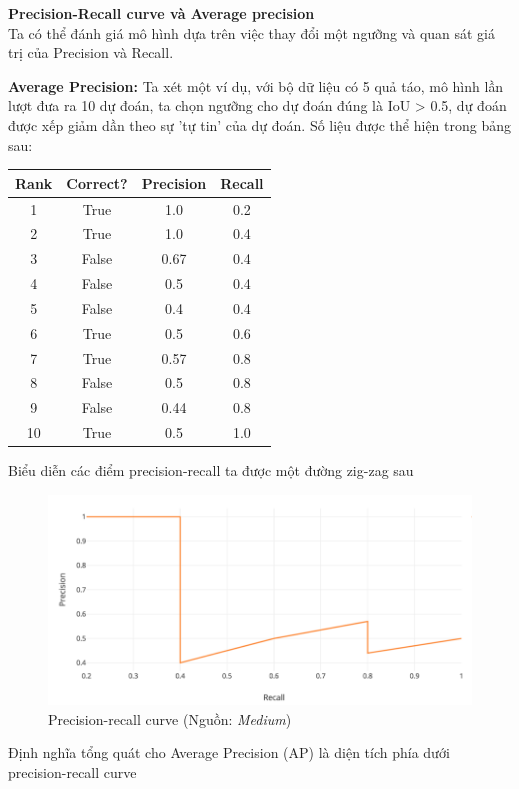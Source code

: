 \documentclass[a4paper, 12pt]{report}
\begin{document}
\textbf{Precision-Recall curve và Average precision}\\
Ta có thể đánh giá mô hình dựa trên việc thay đổi một ngưỡng và quan sát giá trị của Precision và Recall.\par
\textbf{Average Precision:} Ta xét một ví dụ, với bộ dữ liệu có 5 quả táo, mô hình lần lượt đưa ra 10 dự đoán, ta chọn ngưỡng cho dự đoán đúng là IoU > 0.5, dự đoán được xếp giảm dần theo sự 'tự tin' của dự đoán. Số liệu được thể hiện trong bảng sau: \par
	\begin{center}
		\begin{tabular}{||c c c c ||} 
			\hline
			Rank & Correct? & Precision & Recall \\ [0.5ex] 
			\hline\hline
			1 & True & 1.0 & 0.2   \\ 
			\hline
			2 & True & 1.0 & 0.4   \\
			\hline
			3 & False & 0.67 & 0.4 \\
			\hline
			4 & False & 0.5 & 0.4  \\
			\hline
			5 & False & 0.4 & 0.4  \\ 
			\hline
			6 & True & 0.5 & 0.6  \\
			\hline
			7 & True & 0.57 & 0.8  \\
			\hline
			8 & False & 0.5 & 0.8  \\
			\hline
			9 & False & 0.44 & 0.8  \\
			\hline
			10 & True & 0.5 & 1.0 \\
			\hline
		\end{tabular}
	\end{center}
Biểu diễn các điểm precision-recall ta được một đường zig-zag sau\par 
\begin{figure}[!h]
	\centering
	\includegraphics[width=0.7\linewidth]{Images/screensprhot001}
	\caption{Precision-recall curve (Nguồn: \textit{Medium})}
	\label{fig:screensprhot001}
\end{figure}
Định nghĩa tổng quát cho Average Precision (AP) là diện tích phía dưới precision-recall curve 
\end{document}
